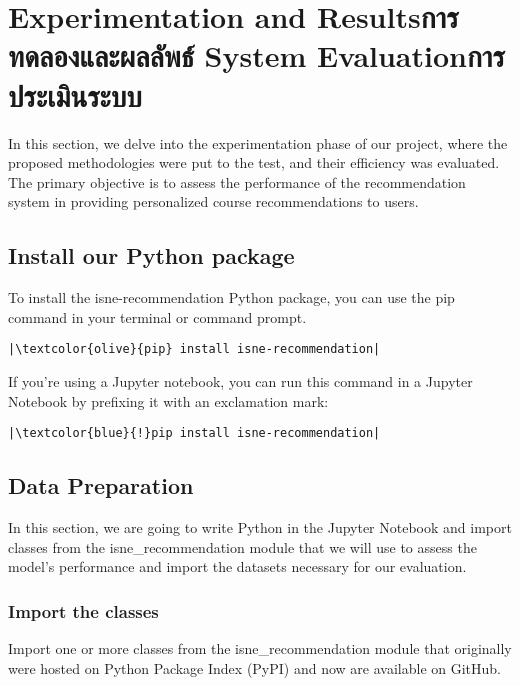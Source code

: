 \chapter{\ifproject%
\ifenglish Experimentation and Results\else การทดลองและผลลัพธ์\fi
\else%
\ifenglish System Evaluation\else การประเมินระบบ\fi
\fi}

In this section, we delve into the experimentation phase of our project, where 
the proposed methodologies were put to the test, and their efficiency was 
evaluated. The primary objective is to assess the performance of the 
recommendation system in providing personalized course recommendations to users.

\section{Install our Python package}

To install the isne-recommendation Python package, you can use the pip command 
in your terminal or command prompt.

\begin{verbatim}
|\textcolor{olive}{pip} install isne-recommendation|
\end{verbatim}

\noindent If you're using a Jupyter notebook, you can run this command in a 
Jupyter Notebook by prefixing it with an exclamation mark:

\begin{verbatim}
|\textcolor{blue}{!}pip install isne-recommendation|
\end{verbatim}

\section{Data Preparation}

In this section, we are going to write Python in the Jupyter Notebook 
and import classes from the isne\_recommendation module 
that we will use to assess the model's performance and import the datasets 
necessary for our evaluation.

\subsection{Import the classes}

Import one or more classes from the isne\_recommendation module that originally 
were hosted on Python Package Index (PyPI) and now are available on GitHub. 

